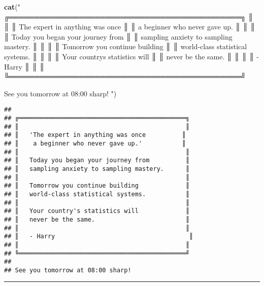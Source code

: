 \documentclass[
]{article}
\newenvironment{Shaded}{\begin{snugshade}}{\end{snugshade}}
\newcommand{\FunctionTok}[1]{\textcolor[rgb]{0.13,0.29,0.53}{\textbf{#1}}}
\newcommand{\NormalTok}[1]{#1}
\newcommand{\StringTok}[1]{\textcolor[rgb]{0.31,0.60,0.02}{#1}}
\begin{document}
\begin{Shaded}
\begin{Highlighting}[]
\FunctionTok{cat}\NormalTok{(}\StringTok{"}
\StringTok{╔══════════════════════════════════════════════╗}
\StringTok{║                                              ║}
\StringTok{║   \textquotesingle{}The expert in anything was once          ║}
\StringTok{║    a beginner who never gave up.\textquotesingle{}           ║}
\StringTok{║                                              ║}
\StringTok{║   Today you began your journey from          ║}
\StringTok{║   sampling anxiety to sampling mastery.      ║}
\StringTok{║                                              ║}
\StringTok{║   Tomorrow you continue building             ║}
\StringTok{║   world{-}class statistical systems.           ║}
\StringTok{║                                              ║}
\StringTok{║   Your country\textquotesingle{}s statistics will             ║}
\StringTok{║   never be the same.                         ║}
\StringTok{║                                              ║}
\StringTok{║   {-} Harry                                     ║}
\StringTok{║                                              ║}
\StringTok{╚══════════════════════════════════════════════╝}

\StringTok{See you tomorrow at 08:00 sharp!}
\StringTok{"}\NormalTok{)}
\end{Highlighting}
\end{Shaded}

\begin{verbatim}
## 
## ╔══════════════════════════════════════════════╗
## ║                                              ║
## ║   'The expert in anything was once          ║
## ║    a beginner who never gave up.'           ║
## ║                                              ║
## ║   Today you began your journey from          ║
## ║   sampling anxiety to sampling mastery.      ║
## ║                                              ║
## ║   Tomorrow you continue building             ║
## ║   world-class statistical systems.           ║
## ║                                              ║
## ║   Your country's statistics will             ║
## ║   never be the same.                         ║
## ║                                              ║
## ║   - Harry                                     ║
## ║                                              ║
## ╚══════════════════════════════════════════════╝
## 
## See you tomorrow at 08:00 sharp!
\end{verbatim}

\begin{center}\rule{0.5\linewidth}{0.5pt}\end{center}
\end{document}
